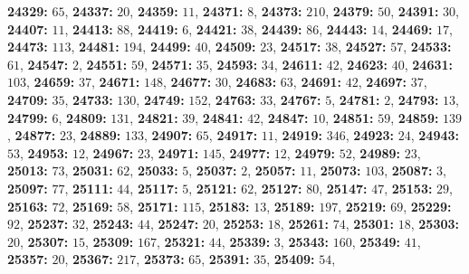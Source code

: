 \textsf{\bfseries 24329:} $65$, \textsf{\bfseries 24337:} $20$, \textsf{\bfseries 24359:} $11$, \textsf{\bfseries 24371:} $8$, \textsf{\bfseries 24373:} $210$, \textsf{\bfseries 24379:} $50$, \textsf{\bfseries 24391:} $30$, \textsf{\bfseries 24407:} $11$, \textsf{\bfseries 24413:} $88$, \textsf{\bfseries 24419:} $6$, \textsf{\bfseries 24421:} $38$, \textsf{\bfseries 24439:} $86$, \textsf{\bfseries 24443:} $14$, \textsf{\bfseries 24469:} $17$, \textsf{\bfseries 24473:} $113$, \textsf{\bfseries 24481:} $194$, \textsf{\bfseries 24499:} $40$, \textsf{\bfseries 24509:} $23$, \textsf{\bfseries 24517:} $38$, \textsf{\bfseries 24527:} $57$, \textsf{\bfseries 24533:} $61$, \textsf{\bfseries 24547:} $2$, \textsf{\bfseries 24551:} $59$, \textsf{\bfseries 24571:} $35$, \textsf{\bfseries 24593:} $34$, \textsf{\bfseries 24611:} $42$, \textsf{\bfseries 24623:} $40$, \textsf{\bfseries 24631:} $103$, \textsf{\bfseries 24659:} $37$, \textsf{\bfseries 24671:} $148$, \textsf{\bfseries 24677:} $30$, \textsf{\bfseries 24683:} $63$, \textsf{\bfseries 24691:} $42$, \textsf{\bfseries 24697:} $37$, \textsf{\bfseries 24709:} $35$, \textsf{\bfseries 24733:} $130$, \textsf{\bfseries 24749:} $152$, \textsf{\bfseries 24763:} $33$, \textsf{\bfseries 24767:} $5$, \textsf{\bfseries 24781:} $2$, \textsf{\bfseries 24793:} $13$, \textsf{\bfseries 24799:} $6$, \textsf{\bfseries 24809:} $131$, \textsf{\bfseries 24821:} $39$, \textsf{\bfseries 24841:} $42$, \textsf{\bfseries 24847:} $10$, \textsf{\bfseries 24851:} $59$, \textsf{\bfseries 24859:} $139$, \textsf{\bfseries 24877:} $23$, \textsf{\bfseries 24889:} $133$, \textsf{\bfseries 24907:} $65$, \textsf{\bfseries 24917:} $11$, \textsf{\bfseries 24919:} $346$, \textsf{\bfseries 24923:} $24$, \textsf{\bfseries 24943:} $53$, \textsf{\bfseries 24953:} $12$, \textsf{\bfseries 24967:} $23$, \textsf{\bfseries 24971:} $145$, \textsf{\bfseries 24977:} $12$, \textsf{\bfseries 24979:} $52$, \textsf{\bfseries 24989:} $23$, \textsf{\bfseries 25013:} $73$, \textsf{\bfseries 25031:} $62$, \textsf{\bfseries 25033:} $5$, \textsf{\bfseries 25037:} $2$, \textsf{\bfseries 25057:} $11$, \textsf{\bfseries 25073:} $103$, \textsf{\bfseries 25087:} $3$, \textsf{\bfseries 25097:} $77$, \textsf{\bfseries 25111:} $44$, \textsf{\bfseries 25117:} $5$, \textsf{\bfseries 25121:} $62$, \textsf{\bfseries 25127:} $80$, \textsf{\bfseries 25147:} $47$, \textsf{\bfseries 25153:} $29$, \textsf{\bfseries 25163:} $72$, \textsf{\bfseries 25169:} $58$, \textsf{\bfseries 25171:} $115$, \textsf{\bfseries 25183:} $13$, \textsf{\bfseries 25189:} $197$, \textsf{\bfseries 25219:} $69$, \textsf{\bfseries 25229:} $92$, \textsf{\bfseries 25237:} $32$, \textsf{\bfseries 25243:} $44$, \textsf{\bfseries 25247:} $20$, \textsf{\bfseries 25253:} $18$, \textsf{\bfseries 25261:} $74$, \textsf{\bfseries 25301:} $18$, \textsf{\bfseries 25303:} $20$, \textsf{\bfseries 25307:} $15$, \textsf{\bfseries 25309:} $167$, \textsf{\bfseries 25321:} $44$, \textsf{\bfseries 25339:} $3$, \textsf{\bfseries 25343:} $160$, \textsf{\bfseries 25349:} $41$, \textsf{\bfseries 25357:} $20$, \textsf{\bfseries 25367:} $217$, \textsf{\bfseries 25373:} $65$, \textsf{\bfseries 25391:} $35$, \textsf{\bfseries 25409:} $54$, 
